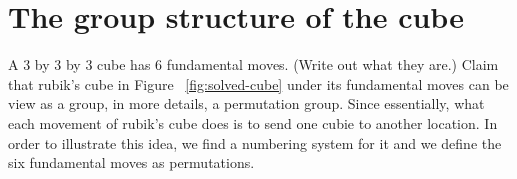 \chapter{The group structure of the cube}
A 3 by 3 by 3 cube has 6 fundamental moves. (Write out what they are.)
Claim that rubik's cube in Figure ~\ref{fig:solved-cube} under its fundamental moves can be view as a group, in more details, a permutation group. Since essentially, what each movement of rubik's cube does is to send one cubie to another location. In order to illustrate this idea, we find a numbering system for it and we define the six fundamental moves as permutations.
